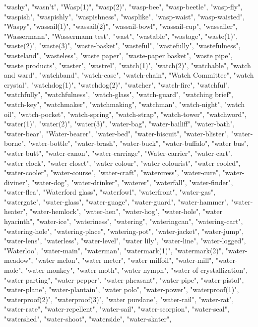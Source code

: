 "washy",
"wasn't",
"Wasp(1)",
"wasp(2)",
"wasp-bee",
"wasp-beetle",
"wasp-fly",
"waspish",
"waspishly",
"waspishness",
"wasplike",
"wasp-waist",
"wasp-waisted",
"Waspy",
"wassail(1)",
"wassail(2)",
"wassail-bowl",
"wassail-cup",
"wassailer",
"Wassermann",
"Wassermann test",
"wast",
"wastable",
"wastage",
"waste(1)",
"waste(2)",
"waste(3)",
"waste-basket",
"wasteful",
"wastefully",
"wastefulness",
"wasteland",
"wasteless",
"waste paper",
"waste-paper basket",
"waste pipe",
"waste products",
"waster",
"wastrel",
"watch(1)",
"watch(2)",
"watchable",
"watch and ward",
"watchband",
"watch-case",
"watch-chain",
"Watch Committee",
"watch crystal",
"watchdog(1)",
"watchdog(2)",
"watcher",
"watch-fire",
"watchful",
"watchfully",
"watchfulness",
"watch-glass",
"watch-guard",
"watching brief",
"watch-key",
"watchmaker",
"watchmaking",
"watchman",
"watch-night",
"watch oil",
"watch-pocket",
"watch-spring",
"watch-strap",
"watch-tower",
"watchword",
"water(1)",
"water(2)",
"water(3)",
"water-bag",
"water-bailiff",
"water-bath",
"water-bear",
"Water-bearer",
"water-bed",
"water-biscuit",
"water-blister",
"water-borne",
"water-bottle",
"water-brash",
"water-buck",
"water-buffalo",
"water bus",
"water-butt",
"water-canon",
"water-carriage",
"Water-carrier",
"water-cart",
"water-clock",
"water-closet",
"water-colour",
"water-colourist",
"water-cooled",
"water-cooler",
"water-course",
"water-craft",
"watercress",
"water-cure",
"water-diviner",
"water-dog",
"water-drinker",
"waterer",
"waterfall",
"water-finder",
"water-flea",
"Waterford glass",
"waterfowl",
"waterfront",
"water-gas",
"watergate",
"water-glass",
"water-guage",
"water-guard",
"water-hammer",
"water-heater",
"water-hemlock",
"water-hen",
"water-hog",
"water-hole",
"water hyacinth",
"water-ice",
"wateriness",
"watering",
"wateringcan",
"watering-cart",
"watering-hole",
"watering-place",
"watering-pot",
"water-jacket",
"water-jump",
"water-lens",
"waterless",
"water-level",
"water lily",
"water-line",
"water-logged",
"Waterloo",
"water-main",
"waterman",
"watermark(1)",
"watermark(2)",
"water-meadow",
"water melon",
"water meter",
"water milfoil",
"water-mill",
"water-mole",
"water-monkey",
"water-moth",
"water-nymph",
"water of crystallization",
"water-parting",
"water-pepper",
"water-pheasant",
"water-pipe",
"water-pistol",
"water-plane",
"water-plantain",
"water polo",
"water-power",
"waterproof(1)",
"waterproof(2)",
"waterproof(3)",
"water purslane",
"water-rail",
"water-rat",
"water-rate",
"water-repellent",
"water-sail",
"water-scorpion",
"water-seal",
"watershed",
"water-shoot",
"waterside",
"water-skater",

